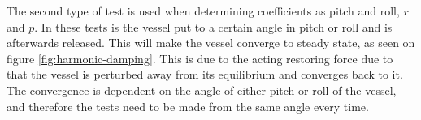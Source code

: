 The second type of test is used when determining coefficients as pitch and roll, $r$ and $p$. In these tests is the vessel put to a certain angle in pitch or roll and is afterwards released. This will make the vessel converge to steady state, as seen on figure \ref{fig:harmonic-damping}. This is due to the acting restoring force due to that the vessel is perturbed away from its equilibrium and converges back to it. The convergence is dependent on the angle of either pitch or roll of the vessel, and therefore the tests need to be made from the same angle every time.


